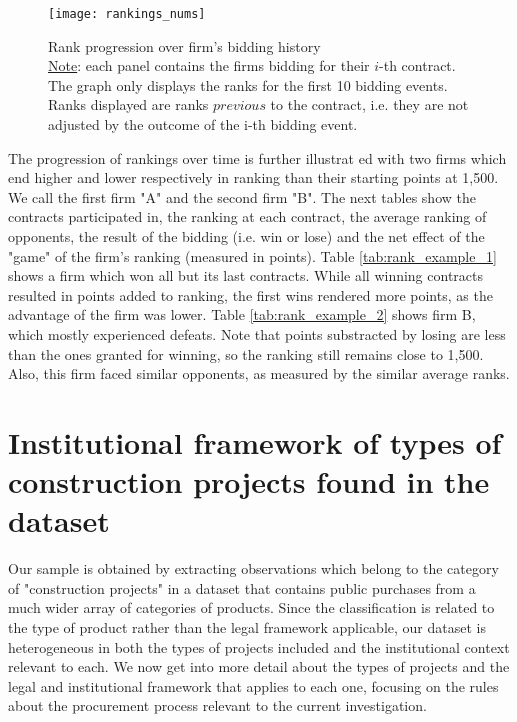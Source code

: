 \begin{figure}[H]
\centering
  \texttt{[image: rankings\_nums]}
  \caption{Rank progression over firm's bidding history \\ \footnotesize \underline{Note}: each panel contains the firms bidding for their $i$-th contract. The graph only displays the ranks for the first 10 bidding events. Ranks displayed are ranks $previous$ to the contract, i.e. they are not adjusted by the outcome of the i-th bidding event.}
  \label{fig:rankings_nums}
\end{figure}

The progression of rankings over time is further illustrat ed with two firms which end higher and lower respectively in ranking than their starting points at 1,500. We call the first firm "A" and the second firm "B".  The next tables show the contracts participated in, the ranking at each contract, the average ranking of opponents, the result of the bidding (i.e. win or lose) and the net effect of the "game" of the firm's ranking (measured in points). Table \ref{tab:rank_example_1} shows a firm which won all but its last contracts. While all winning contracts resulted in points added to ranking, the first wins rendered more points, as the advantage of the firm was lower. Table \ref{tab:rank_example_2} shows firm B, which mostly experienced defeats. Note that points substracted by losing are less than the ones granted for winning, so the ranking still remains close to 1,500. Also, this firm faced similar opponents, as measured by the similar average ranks.




\clearpage
\section{Institutional framework of types of construction projects found in the dataset}
\label{section:app_insti}
Our sample is obtained by extracting observations which belong to the category of "construction projects" in a dataset that contains public purchases from a much wider array of categories of products. Since the classification is related to the type of product rather than the legal framework applicable, our dataset is heterogeneous in both the types of projects included and the institutional context relevant to each. We now get into more detail about the types of projects and the legal and institutional framework that applies to each one, focusing on the rules about the procurement process relevant to the current investigation.

